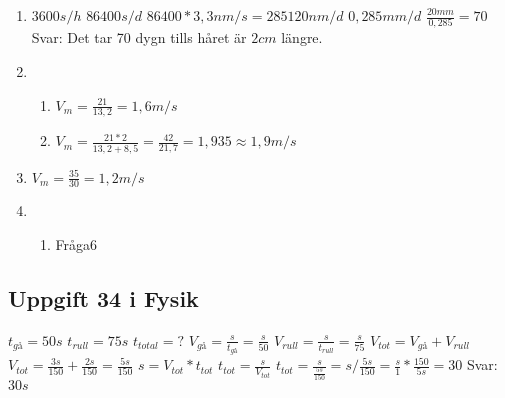 \documentclass[a4paper,11pt]{article}
\begin{document}
\begin{flushleft}
\begin{enumerate}
  \item $ 3600s/h $\newline
  $ 86400s/d $\newline
  $ 86400*3,3nm/s=285120nm/d $\newline
  $ 0,285mm/d $\newline
  $ \frac{20mm}{0,285}=70 $\newline
  Svar: Det tar 70 dygn tills håret är $2cm$ längre.
  \item \begin{enumerate}
    \item $ V_m=\frac{21}{13,2}=1,6m/s $\newline
    \item $ V_m=\frac{21*2}{13,2+8,5}=\frac{42}{21,7}=1,935\approx1,9m/s $\newline
  \end{enumerate}
  \item $ V_m=\frac{35}{30}=1,2m/s $
  \item \begin{enumerate}
    \item Fråga6
  \end{enumerate}
\end{enumerate}
\newpage
\subsection{Uppgift 34 i Fysik}
$ t_{gå}=50s $\newline
$ t_{rull}=75s $\newline
$ t_{total}=?$\newline
$ V_{gå}=\frac{s}{t_{gå}}=\frac{s}{50} $\newline
$ V_{rull}=\frac{s}{t_{rull}}=\frac{s}{75} $\newline
$ V_{tot}=V_{gå}+V_{rull} $\newline
$ V_{tot}=\frac{3s}{150}+\frac{2s}{150}=\frac{5s}{150} $\newline
$ s=V_{tot}*t_{tot} $\newline
$ t_{tot}=\frac{s}{V_{tot}} $\newline
$ t_{tot}=\frac{s}{\frac{5s}{150}}=s/\frac{5s}{150}=\frac{s}{1}*\frac{150}{5s}=30 $\newline
Svar: $30s$
\end{flushleft}
\end{document}
